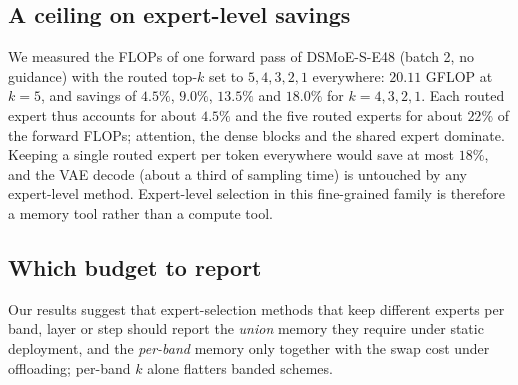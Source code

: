 \subsection{A ceiling on expert-level savings}\label{sec:flops}
We measured the FLOPs of one forward pass of DSMoE-S-E48 (batch 2, no guidance) with the routed top-$k$ set to $5,4,3,2,1$ everywhere: $20.11$ GFLOP at $k=5$, and savings of $4.5\%$, $9.0\%$, $13.5\%$ and $18.0\%$ for $k=4,3,2,1$.
Each routed expert thus accounts for about $4.5\%$ and the five routed experts for about $22\%$ of the forward FLOPs; attention, the dense blocks and the shared expert dominate. Keeping a single routed expert per token everywhere would save at most $18\%$, and the VAE decode (about a third of sampling time) is untouched by any expert-level method. Expert-level selection in this fine-grained family is therefore a memory tool rather than a compute tool.

\subsection{Which budget to report}
Our results suggest that expert-selection methods that keep different experts per band, layer or step should report the \emph{union} memory they require under static deployment, and the \emph{per-band} memory only together with the swap cost under offloading; per-band $k$ alone flatters banded schemes. 
